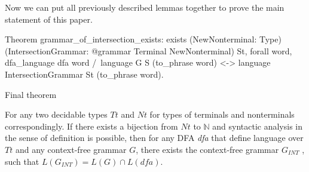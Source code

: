 Now we can put all previously described lemmas together to prove the main statement of this paper.

\begin{listing}[h]
   \begin{pyglist}[language=coq, numbers=none, numbersep=5pt]

Theorem grammar_of_intersection_exists:
 exists
  (NewNonterminal: Type)
  (IntersectionGrammar: @grammar Terminal NewNonterminal) St,
 forall word,
   dfa_language dfa word /\ language G S (to_phrase word) <->
   language IntersectionGrammar St (to_phrase word).
  \end{pyglist}
\caption{Final theorem}
\label{lst:lang-eq}
\end{listing}

\begin{theorem}
    For any two decidable types $Tt$ and $Nt$ for types of terminals and nonterminals correspondingly.
    If there exists a bijection from $Nt$ to $\mathbb{N}$ and syntactic analysis in the sense of definition is possible, then for any DFA \textit{dfa} that define language over $Tt$ and any context-free grammar $G$, there exists the context-free grammar $G_{INT}$ , such that $L(G_{INT}) = L(G) \cap L(\textit{dfa})$.
\end{theorem}

